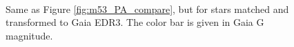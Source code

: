 \documentclass[]{spie}  %
\begin{document}
\begin{figure}[!h]
  \centering
  \\
  \hspace{-1cm}
  \caption{Same as Figure \ref{fig:m53_PA_compare}, but for stars matched and transformed to Gaia EDR3. The color bar is given in Gaia G magnitude.} \label{fig:m53_PA_compare_gaia}
\end{figure}
\end{document}
